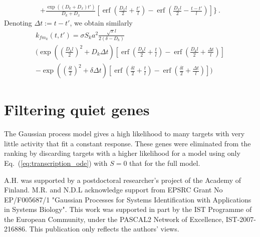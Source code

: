 \documentclass{pnastwo}
\newcommand{\erf}{\operatorname{erf}}
\begin{document}
\begin{article}
\begin{materials}
\begin{multline*}
    + \frac{\exp((D_k+D_x)t')}{D_k+D_x}
    [\erf(\frac{D_x l}{2} + \frac{t'}{l})
    - \erf(\frac{D_x l}{2} - \frac{t-t'}{l})]
    \bigg\}\ .
  \end{multline*}
  Denoting $\Delta t := t - t'$, we obtain similarly
  \begin{multline*}
    k_{f m_k}(t, t')
    = \sigma S_k a^2 \frac{\sqrt{\pi} l}{2(\delta - D_k)} \\
    \bigg(
    \exp\left(\left(\frac{D_k l}{2}\right)^2 + D_k \Delta t \right)
    [\erf(\frac{D_k l}{2} + \frac{t}{l}) - \erf(\frac{D_k l}{2} + \frac{\Delta t}{l})] \\
    -
    \exp\left(\left(\frac{\delta l}{2}\right)^2 + \delta \Delta t\right)
    [\erf(\frac{\delta l}{2} + \frac{t}{l}) - \erf(\frac{\delta l}{2} + \frac{\Delta t}{l})]
    \bigg)
  \end{multline*}

  \section{Filtering quiet genes}
  The Gaussian process model gives a high likelihood to many targets
  with very little activity that fit a constant response.  These genes
  were eliminated from the ranking by discarding targets with a higher
  likelihood for a model using only Eq.~(\ref{eq:transcription_ode})
  with $S=0$ that for the full model.
  
\end{materials}

\begin{acknowledgments}
A.H. was supported by a postdoctoral researcher's project of the Academy of Finland.
M.R. and N.D.L acknowledge support from EPSRC Grant No EP/F005687/1 "Gaussian Processes for Systems Identification with Applications in Systems Biology". 
This work was supported in part by the IST Programme of the European Community, under the PASCAL2 Network of Excellence, IST-2007-216886. This publication only reflects the authors' views.
\end{acknowledgments}




%
\end{article}

\end{document}
